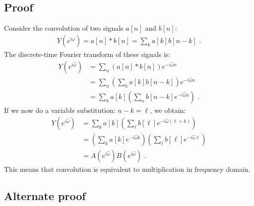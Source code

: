\subsection*{Proof}
Consider the convolution of two signals $a[n]$ and $b[n]$:
\begin{align}
Y(e^{i\hat{\omega}}) = a[n]*b[n] = \sum_k a[k] b[n-k]\,\,.
\end{align}
The discrete-time Fourier transform of these signals is:
\begin{align}
Y(e^{i\hat{\omega}}) &= \sum_n (a[n]*b[n]) e^{-i\hat{\omega}n}\\
     &= \sum_n \left(\sum_k a[k]b[n-k]\right) e^{-i\hat{\omega}n}\\
     &= \sum_k a[k] \left(\sum_n b[n-k] e^{-i\hat{\omega}n}\right)\,\,.
\end{align}
If we now do a variable substitution: $n-k=\ell$, we obtain:
\begin{align}
Y(e^{i\hat{\omega}}) &= \sum_k a[k] \left(\sum_\ell b[\ell] e^{-i\hat{\omega}(\ell+k)}\right)\\
     &= \left(\sum_k a[k] e^{-i\hat{\omega}k}\right) \left(\sum_\ell b[\ell] e^{-i\hat{\omega}\ell}\right)\\
     &= A(e^{i\hat{\omega}})B(e^{i\hat{\omega}})\,\,.
\end{align}
This means that convolution is equivalent to multiplication in frequency domain. 

\subsection*{Alternate proof}

